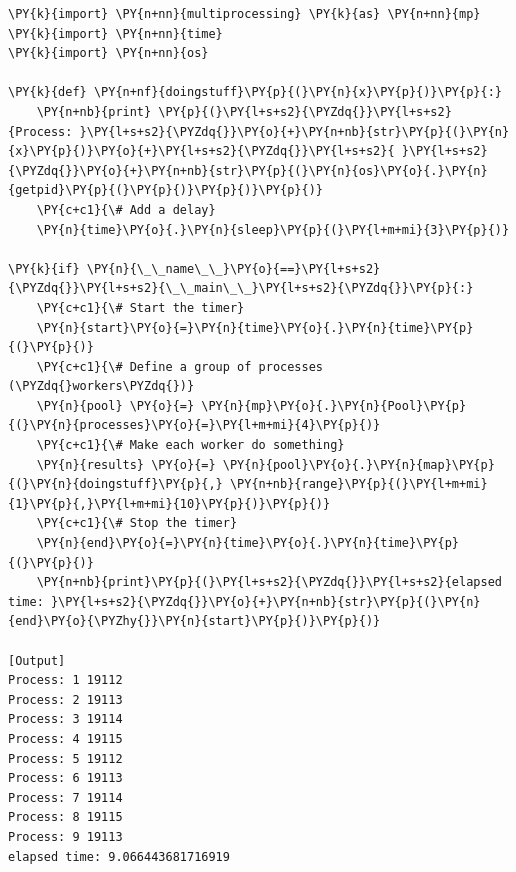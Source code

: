 \begin{Verbatim}[label=\makebox{\url{https://github.com/lucabaldini/cmepda/tree/master/slides/latex/snippets/multiprocessing_pool_doingstuff.py}},commandchars=\\\{\}]
\PY{k}{import} \PY{n+nn}{multiprocessing} \PY{k}{as} \PY{n+nn}{mp}
\PY{k}{import} \PY{n+nn}{time}
\PY{k}{import} \PY{n+nn}{os}

\PY{k}{def} \PY{n+nf}{doingstuff}\PY{p}{(}\PY{n}{x}\PY{p}{)}\PY{p}{:}
    \PY{n+nb}{print} \PY{p}{(}\PY{l+s+s2}{\PYZdq{}}\PY{l+s+s2}{Process: }\PY{l+s+s2}{\PYZdq{}}\PY{o}{+}\PY{n+nb}{str}\PY{p}{(}\PY{n}{x}\PY{p}{)}\PY{o}{+}\PY{l+s+s2}{\PYZdq{}}\PY{l+s+s2}{ }\PY{l+s+s2}{\PYZdq{}}\PY{o}{+}\PY{n+nb}{str}\PY{p}{(}\PY{n}{os}\PY{o}{.}\PY{n}{getpid}\PY{p}{(}\PY{p}{)}\PY{p}{)}\PY{p}{)}
    \PY{c+c1}{\# Add a delay}
    \PY{n}{time}\PY{o}{.}\PY{n}{sleep}\PY{p}{(}\PY{l+m+mi}{3}\PY{p}{)}

\PY{k}{if} \PY{n}{\_\_name\_\_}\PY{o}{==}\PY{l+s+s2}{\PYZdq{}}\PY{l+s+s2}{\_\_main\_\_}\PY{l+s+s2}{\PYZdq{}}\PY{p}{:}
    \PY{c+c1}{\# Start the timer}
    \PY{n}{start}\PY{o}{=}\PY{n}{time}\PY{o}{.}\PY{n}{time}\PY{p}{(}\PY{p}{)}
    \PY{c+c1}{\# Define a group of processes (\PYZdq{}workers\PYZdq{})}
    \PY{n}{pool} \PY{o}{=} \PY{n}{mp}\PY{o}{.}\PY{n}{Pool}\PY{p}{(}\PY{n}{processes}\PY{o}{=}\PY{l+m+mi}{4}\PY{p}{)}
    \PY{c+c1}{\# Make each worker do something}
    \PY{n}{results} \PY{o}{=} \PY{n}{pool}\PY{o}{.}\PY{n}{map}\PY{p}{(}\PY{n}{doingstuff}\PY{p}{,} \PY{n+nb}{range}\PY{p}{(}\PY{l+m+mi}{1}\PY{p}{,}\PY{l+m+mi}{10}\PY{p}{)}\PY{p}{)}
    \PY{c+c1}{\# Stop the timer}
    \PY{n}{end}\PY{o}{=}\PY{n}{time}\PY{o}{.}\PY{n}{time}\PY{p}{(}\PY{p}{)}
    \PY{n+nb}{print}\PY{p}{(}\PY{l+s+s2}{\PYZdq{}}\PY{l+s+s2}{elapsed time: }\PY{l+s+s2}{\PYZdq{}}\PY{o}{+}\PY{n+nb}{str}\PY{p}{(}\PY{n}{end}\PY{o}{\PYZhy{}}\PY{n}{start}\PY{p}{)}\PY{p}{)}

[Output]
Process: 1 19112
Process: 2 19113
Process: 3 19114
Process: 4 19115
Process: 5 19112
Process: 6 19113
Process: 7 19114
Process: 8 19115
Process: 9 19113
elapsed time: 9.066443681716919
\end{Verbatim}